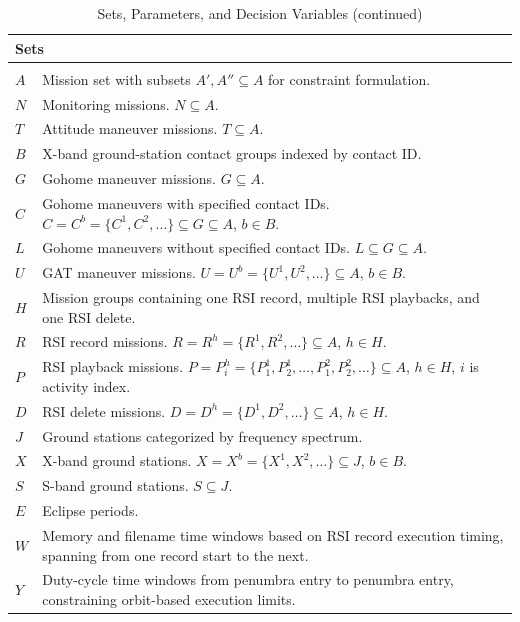 \documentclass[preprint,3p,12pt,authoryear]{elsarticle}
\begin{document}
\begin{longtable}{p{} p{}}
\caption{Sets, Parameters, and Decision Variables} \label{tab:notation} \\
\hline
\multicolumn{2}{l}{\textbf{Sets}} \\
\hline
\endfirsthead
\caption[]{Sets, Parameters, and Decision Variables (continued)} \\
\hline
\endhead
\hline
\endfoot
$A$ & Mission set with subsets $A', A'' \subseteq A$ for constraint formulation. \\
$N$ & Monitoring missions. $N \subseteq A$. \\
$T$ & Attitude maneuver missions. $T \subseteq A$. \\
$B$ & X-band ground-station contact groups indexed by contact ID. \\
$G$ & Gohome maneuver missions. $G \subseteq A$. \\
$C$ & Gohome maneuvers with specified contact IDs. $C = C^b = \{C^1, C^2, \dots\} \subseteq G \subseteq A$, $b \in B$. \\
$L$ & Gohome maneuvers without specified contact IDs. $L \subseteq G \subseteq A$. \\
$U$ & GAT maneuver missions. $U = U^b = \{U^1, U^2, \dots\} \subseteq A$, $b \in B$. \\
$H$ & Mission groups containing one RSI record, multiple RSI playbacks, and one RSI delete. \\
$R$ & RSI record missions. $R = R^h = \{R^1, R^2, \dots\} \subseteq A$, $h \in H$. \\
$P$ & RSI playback missions. $P = P_{i}^h = \{P_{1}^1, P_{2}^1, \dots, P_{1}^2, P_{2}^2, \dots\} \subseteq A$, $h \in H$, $i$ is activity index. \\
$D$ & RSI delete missions. $D = D^h = \{D^1, D^2, \dots\} \subseteq A$, $h \in H$. \\
$J$ & Ground stations categorized by frequency spectrum. \\
$X$ & X-band ground stations. $X = X^b = \{X^1, X^2, \dots\} \subseteq J$, $b \in B$. \\
$S$ & S-band ground stations. $S \subseteq J$. \\
$E$ & Eclipse periods. \\
$W$ & Memory and filename time windows based on RSI record execution timing, spanning from one record start to the next. \\
$Y$ & Duty-cycle time windows from penumbra entry to penumbra entry, constraining orbit-based execution limits. \\

\end{longtable}
\end{document}
